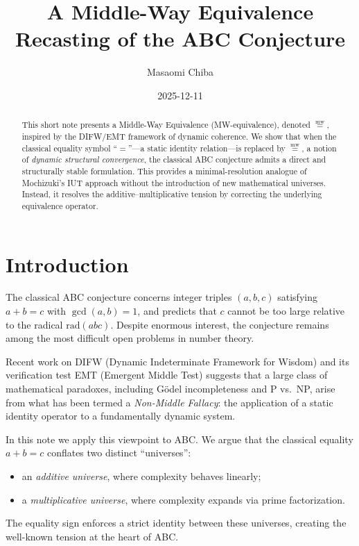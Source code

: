 \documentclass[11pt]{article}
\title{A Middle-Way Equivalence Recasting of the ABC Conjecture}
\author{Masaomi Chiba}
\date{2025-12-11}
\newcommand{\mweq}{\mathrel{\overset{\mathrm{mw}}{=}}}
\begin{document}
\maketitle

\begin{abstract}
This short note presents a Middle-Way Equivalence (MW-equivalence),
denoted $\mweq$, inspired by the DIFW/EMT framework of dynamic coherence.
We show that when the classical equality symbol ``$=$''---a static
identity relation---is replaced by $\mweq$, a notion of
\emph{dynamic structural convergence}, the classical ABC conjecture
admits a direct and structurally stable formulation.  This provides a
minimal-resolution analogue of Mochizuki's IUT approach without the
introduction of new mathematical universes.  Instead, it resolves the
additive--multiplicative tension by correcting the underlying
equivalence operator.
\end{abstract}

\section{Introduction}

The classical ABC conjecture concerns integer triples
$(a,b,c)$ satisfying $a+b=c$ with $\gcd(a,b)=1$, and predicts that $c$
cannot be too large relative to the radical $\mathrm{rad}(abc)$.
Despite enormous interest, the conjecture remains among the most
difficult open problems in number theory.

Recent work on DIFW (Dynamic Indeterminate Framework for Wisdom) and
its verification test EMT (Emergent Middle Test) suggests that a large
class of mathematical paradoxes, including G\"odel incompleteness and
P vs.\ NP, arise from what has been termed a \emph{Non-Middle Fallacy}:
the application of a static identity operator to a fundamentally
dynamic system.

In this note we apply this viewpoint to ABC.  We argue that the
classical equality $a+b=c$ conflates two distinct ``universes'':
\begin{itemize}
\item an \emph{additive universe}, where complexity behaves linearly;
\item a \emph{multiplicative universe}, where complexity expands via
  prime factorization.
\end{itemize}
The equality sign enforces a strict identity between these universes,
creating the well-known tension at the heart of ABC.
\end{document}
